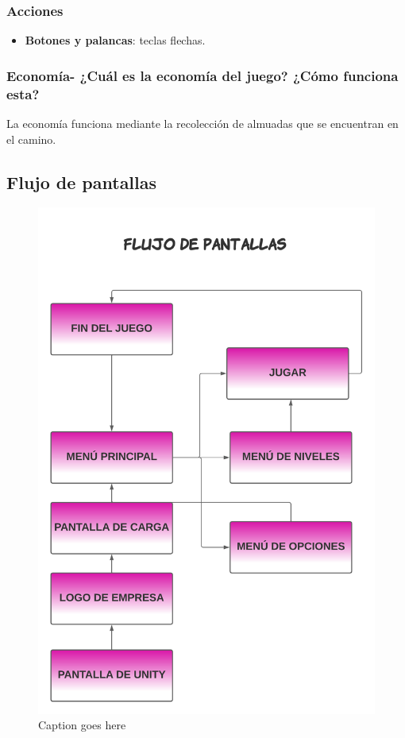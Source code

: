 \subsubsection{Acciones}
\begin{itemize}
  \item \textbf{Botones y palancas}:  teclas flechas.
\end{itemize}

\subsubsection{Economía- ¿Cuál es la economía del juego? ¿Cómo funciona esta?}
La economía funciona mediante la recolección de almuadas que se encuentran en el
camino.

\subsection{ Flujo de pantallas}

\begin{figure}[!ht]
  \centering
  \includegraphics[scale = 0.7]{Figures/0. General/pantallas.png}
  \caption{Caption goes here}
  \label{fig:myfigure}
\end{figure}

